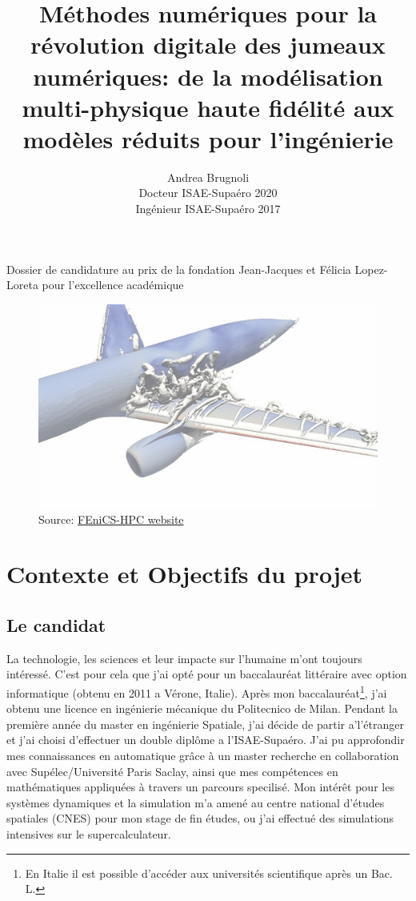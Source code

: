 \documentclass[french]{article}
\author{Andrea Brugnoli \\ 
\hspace{2.8pt} Docteur ISAE-Supaéro 2020\\
Ingénieur ISAE-Supaéro 2017}
\title{Méthodes numériques pour la révolution digitale des jumeaux numériques: de la modélisation multi-physique haute fidélité aux modèles réduits pour l'ingénierie}
\date{}
\begin{document}
\maketitle

\large{Dossier de candidature au prix de la fondation Jean-Jacques et Félicia
	Lopez-Loreta pour l’excellence académique}


\begin{figure}[h]
	\centering
	\includegraphics[width=.95\textwidth]{3Dplane.jpg}
	\captionsetup{labelformat=empty}
	\caption{Source: \href{http://www.fenics-hpc.org/}{FEniCS-HPC website}}
\end{figure}





\thispagestyle{empty}

\newpage

\section{Contexte et Objectifs du projet}

\subsection{Le candidat}
La technologie,  les sciences et leur impacte sur l'humaine m'ont toujours intéressé. C'est pour cela que j'ai opté pour un baccalauréat littéraire avec option informatique (obtenu en 2011 a Vérone, Italie). Après mon baccalauréat\footnote{En Italie il est possible d'accéder aux universités scientifique après un Bac. L.}, j'ai obtenu une licence en ingénierie mécanique du Politecnico de Milan. Pendant la première année du master en ingénierie Spatiale, j'ai décide de partir a'l'étranger et j'ai choisi d'effectuer un double diplôme a l'ISAE-Supaéro. J'ai pu approfondir mes connaissances en automatique grâce \`a un master recherche en collaboration avec Supélec/Université Paris Saclay, ainsi que mes compétences en mathématiques appliquées \`a travers un parcours specilis\'e. Mon intérêt pour les systèmes dynamiques et la simulation m'a amené au centre national d'études spatiales (CNES) pour mon stage de fin études, ou j'ai effectué des simulations intensives sur le supercalculateur. \\
\end{document}
